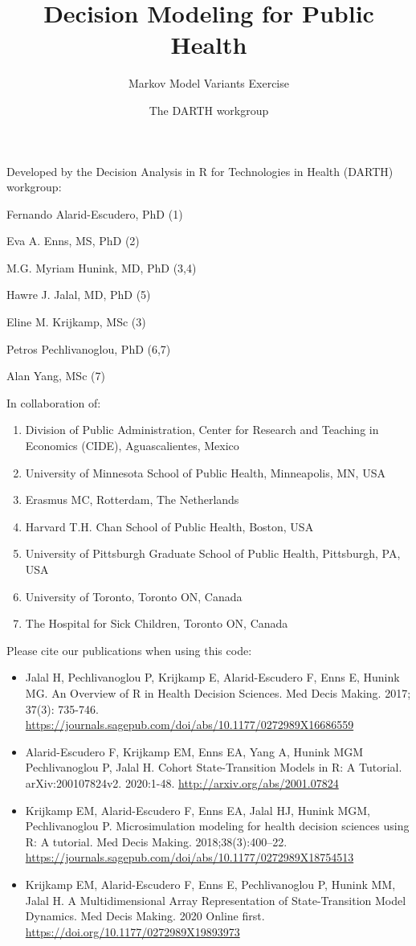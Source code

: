 \documentclass[
]{article}
\title{Decision Modeling for Public Health}
\subtitle{Markov Model Variants Exercise}
\author{The DARTH workgroup}
\date{}
\providecommand{\tightlist}{%
  \setlength{\itemsep}{0pt}\setlength{\parskip}{0pt}}
\begin{document}
\maketitle

Developed by the Decision Analysis in R for Technologies in Health
(DARTH) workgroup:

Fernando Alarid-Escudero, PhD (1)

Eva A. Enns, MS, PhD (2)

M.G. Myriam Hunink, MD, PhD (3,4)

Hawre J. Jalal, MD, PhD (5)

Eline M. Krijkamp, MSc (3)

Petros Pechlivanoglou, PhD (6,7)

Alan Yang, MSc (7)

In collaboration of:

\begin{enumerate}
\def\labelenumi{\arabic{enumi}.}
\tightlist
\item
  Division of Public Administration, Center for Research and Teaching in
  Economics (CIDE), Aguascalientes, Mexico
\item
  University of Minnesota School of Public Health, Minneapolis, MN, USA
\item
  Erasmus MC, Rotterdam, The Netherlands
\item
  Harvard T.H. Chan School of Public Health, Boston, USA
\item
  University of Pittsburgh Graduate School of Public Health, Pittsburgh,
  PA, USA
\item
  University of Toronto, Toronto ON, Canada
\item
  The Hospital for Sick Children, Toronto ON, Canada
\end{enumerate}

Please cite our publications when using this code:

\begin{itemize}
\item
  Jalal H, Pechlivanoglou P, Krijkamp E, Alarid-Escudero F, Enns E,
  Hunink MG. An Overview of R in Health Decision Sciences. Med Decis
  Making. 2017; 37(3): 735-746.
  \url{https://journals.sagepub.com/doi/abs/10.1177/0272989X16686559}
\item
  Alarid-Escudero F, Krijkamp EM, Enns EA, Yang A, Hunink MGM
  Pechlivanoglou P, Jalal H. Cohort State-Transition Models in R: A
  Tutorial. arXiv:200107824v2. 2020:1-48.
  \url{http://arxiv.org/abs/2001.07824}
\item
  Krijkamp EM, Alarid-Escudero F, Enns EA, Jalal HJ, Hunink MGM,
  Pechlivanoglou P. Microsimulation modeling for health decision
  sciences using R: A tutorial. Med Decis Making. 2018;38(3):400--22.
  \url{https://journals.sagepub.com/doi/abs/10.1177/0272989X18754513}
\item
  Krijkamp EM, Alarid-Escudero F, Enns E, Pechlivanoglou P, Hunink MM,
  Jalal H. A Multidimensional Array Representation of State-Transition
  Model Dynamics. Med Decis Making. 2020 Online first.
  \url{https://doi.org/10.1177/0272989X19893973}
\end{itemize}
\end{document}
